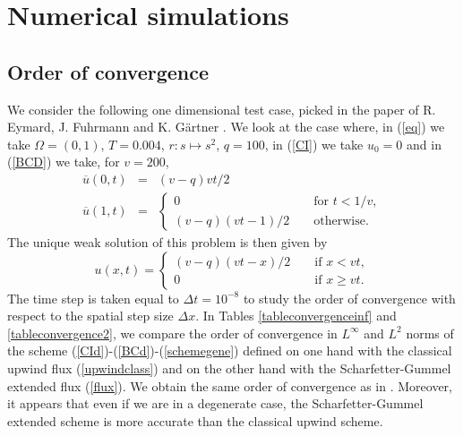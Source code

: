\documentclass[smallextended]{svjour3}
\begin{document}

\section{Numerical simulations}

\subsection{Order of convergence}

We consider the following one dimensional test case, picked in the paper of R. Eymard, J. Fuhrmann and K. Gärtner \cite{Eymard2006}. We look at the case where, in (\ref{eq}) we take $\Omega=(0,1)$, $T=0.004$, $r: s \mapsto s^{2}$, $q=100$, in (\ref{CI}) we take $u_{0}=0$ and in (\ref{BCD}) we take, for $v=200$,
\begin{eqnarray*}
\overline{u}(0,t) &=& (v-q)vt/2\\
\overline{u}(1,t) &=& \left\{ \begin{array}{lcl} 0 & & \text{ for } t<1/v, \\ (v-q)(vt-1)/2 & & \text{ otherwise.}\end{array}\right.
\end{eqnarray*}
The unique weak solution of this problem is then given by
\begin{equation*}
u(x,t)=\left\{\begin{array}{lcl} (v-q)(vt-x)/2 & & \text{ if } x<vt, \\ 0 & & \text{ if } x \geq vt.\end{array}\right.
\end{equation*}
The time step is taken equal to $ \Delta t=10^{-8}$ to study the order of convergence with respect to the spatial step size $\Delta x$. In Tables \ref{tableconvergenceinf} and \ref{tableconvergence2}, we compare the order of convergence in $L^{\infty}$ and $L^{2}$ norms of the scheme (\ref{CId})-(\ref{BCd})-(\ref{schemegene}) defined on one hand with the classical upwind flux (\ref{upwindclass}) and on the other hand with the Scharfetter-Gummel extended flux (\ref{flux}). We obtain the same order of convergence as in \cite{Eymard2006}. Moreover, it appears that even if we are in a degenerate case, the Scharfetter-Gummel extended scheme is more accurate than the classical upwind scheme.
\end{document}
